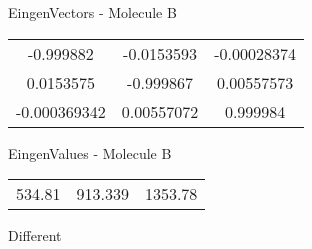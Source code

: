 \begin{multicols}{2}
\begin{center}
\vtab
 EingenVectors - Molecule B     \\
\vtab
\begin{tabular}{|c c c|}
-0.999882	 & 	-0.0153593	 & 	-0.00028374	 \\
0.0153575	 & 	-0.999867	 & 	0.00557573	 \\
-0.000369342	 & 	0.00557072	 & 	0.999984
\end{tabular}

\vtab
 EingenValues - Molecule B     \\
\vtab
\begin{tabular}{|c c c|}
534.81	 & 	913.339	 & 	1353.78	 \\
\end{tabular}

\end{center}
\end{multicols}
\begin{center}
\vtab
\vtab
\textcolor{NavyBlue}{\Large Different}
\end{center}

 \newpage

